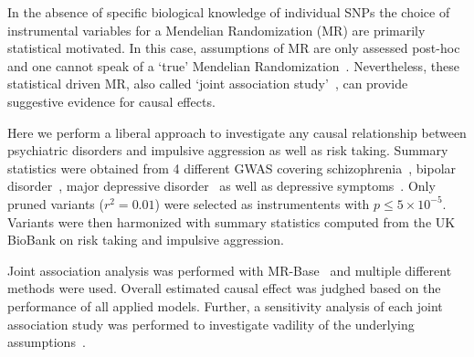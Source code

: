 In the absence of specific biological knowledge of individual SNPs the choice of instrumental variables for a Mendelian Randomization (MR) are primarily statistical motivated.
In this case, assumptions of MR are only assessed post-hoc and one cannot speak of a `true' Mendelian Randomization~\cite{Burgess2016a}.
Nevertheless, these statistical driven MR, also called `joint association study'~\cite{Burgess2016a}, can provide suggestive evidence for causal effects.

Here we perform a liberal approach to investigate any causal relationship between psychiatric disorders and impulsive aggression as well as risk taking.
Summary statistics were obtained from 4 different GWAS covering schizophrenia~\cite{Ripke2014}, bipolar disorder~\cite{PsychiatricGWASConsortiumBipolarDisorderWorkingGroup2011}, major depressive disorder~\cite{MajorDepressiveDisorderWorkingGroupofthePsychiatricGWASConsortium2013} as well as depressive symptoms~\cite{Okbay2016}.
Only pruned variants ($r^2=0.01$) were selected as instrumentents with $p\leq 5\times 10^{-5}$.
Variants were then harmonized with summary statistics computed from the UK BioBank on risk taking and impulsive aggression. 

Joint association analysis was performed with MR-Base~\cite{Hemani2016} and multiple different methods were used.
Overall estimated causal effect was judghed based on the performance of all applied models.
Further, a sensitivity analysis of each joint association study was performed to investigate vadility of the underlying assumptions~\cite{Burgess2016}.  
